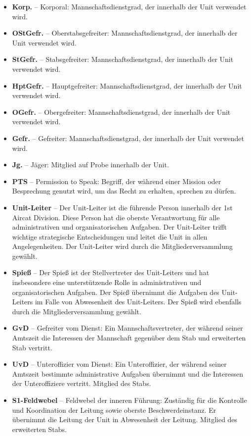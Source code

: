 \begin{itemize}
    \item \textbf{Korp.} -- Korporal: Mannschaftsdienstgrad, der innerhalb der Unit verwendet wird.
    \item \textbf{OStGefr.} -- Oberstabsgefreiter: Mannschaftsdienstgrad, der innerhalb der Unit verwendet wird.
    \item \textbf{StGefr.} -- Stabsgefreiter: Mannschaftsdienstgrad, der innerhalb der Unit verwendet wird.
    \item \textbf{HptGefr.} -- Hauptgefreiter: Mannschaftsdienstgrad, der innerhalb der Unit verwendet wird.
    \item \textbf{OGefr.} -- Obergefreiter: Mannschaftsdienstgrad, der innerhalb der Unit verwendet wird.
    \item \textbf{Gefr.} -- Gefreiter: Mannschaftsdienstgrad, der innerhalb der Unit verwendet wird.
    \item \textbf{Jg.} -- Jäger: Mitglied auf Probe innerhalb der Unit.
    \item \textbf{PTS} -- Permission to Speak: Begriff, der während einer Mission oder Besprechung genutzt wird, um das Recht zu erhalten, sprechen zu dürfen.
    \item \textbf{Unit-Leiter} -- Der Unit-Leiter ist die führende Person innerhalb der 1st Aircat Division. Diese Person hat die oberste Verantwortung für alle administrativen und organisatorischen Aufgaben. Der Unit-Leiter trifft wichtige strategische Entscheidungen und leitet die Unit in allen Angelegenheiten. Der Unit-Leiter wird durch die Mitgliederversammlung gewählt.
    \item \textbf{Spieß} -- Der Spieß ist der Stellvertreter des Unit-Leiters und hat insbesondere eine unterstützende Rolle in administrativen und organisatorischen Aufgaben. Der Spieß übernimmt die Aufgaben des Unit-Leiters im Falle von Abwesenheit des Unit-Leiters. Der Spieß wird ebenfalls durch die Mitgliederversammlung gewählt.
    \item \textbf{GvD} -- Gefreiter vom Dienst: Ein Mannschaftsvertreter, der während seiner Amtszeit die Interessen der Mannschaft gegenüber dem Stab und erweiterten Stab vertritt.
    \item \textbf{UvD} -- Unteroffizier vom Dienst: Ein Unteroffizier, der während seiner Amtszeit bestimmte administrative Aufgaben übernimmt und die Interessen der Unteroffiziere vertritt. Mitglied des Stabs.
    \item \textbf{S1-Feldwebel} -- Feldwebel der inneren Führung: Zuständig für die Kontrolle und Koordination der Leitung sowie oberste Beschwerdeinstanz. Er übernimmt die Leitung der Unit in Abwesenheit der Leitung. Mitglied des erweiterten Stabs.

\end{itemize}
